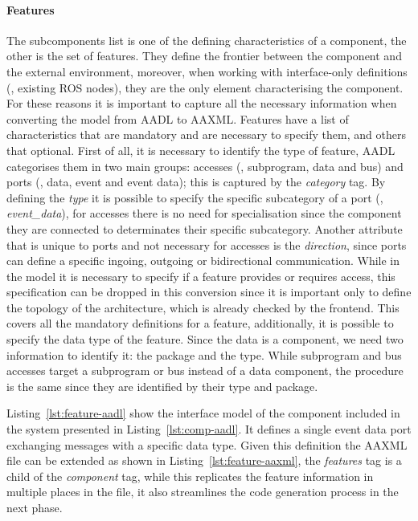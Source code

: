 \paragraph{Features} The subcomponents list is one of the defining characteristics of a component, the other is the set of features. They define the frontier between the component and the external environment, moreover, when working with interface-only definitions (\eg, existing ROS nodes), they are the only element characterising the component. For these reasons it is important to capture all the necessary information when converting the model from AADL to AAXML. Features have a list of characteristics that are mandatory and are necessary to specify them, and others that optional. First of all, it is necessary to identify the type of feature, AADL categorises them in two main groups: accesses (\ie, subprogram, data and bus) and ports (\ie, data, event and event data); this is captured by the \textit{category} tag. By defining the \textit{type} it is possible to specify the specific subcategory of a port (\eg, \textit{event\_data}), for accesses there is no need for specialisation since the component they are connected to determinates their  specific subcategory. Another attribute that is unique to ports and not necessary for accesses is the \textit{direction}, since ports can define a specific ingoing, outgoing or bidirectional communication. While in the model it is necessary to specify if a feature provides or requires access, this specification can be dropped in this conversion since it is important only to define the topology of the architecture, which is already checked by the frontend. This covers all the mandatory definitions for a feature, additionally, it is possible to specify the data type of the feature. Since the data is a component, we need two information to identify it: the package and the type. While subprogram and bus accesses target a subprogram or bus instead of a data component, the procedure is the same since they are identified by their type and package.

Listing~\ref{lst:feature-aadl} show the interface model of the component included in the system presented in Listing~\ref{lst:comp-aadl}. It defines a single event data port exchanging messages with a specific data type. Given this definition the AAXML file can be extended as shown in Listing~\ref{lst:feature-aaxml}, the \textit{features} tag is a child of the \textit{component} tag, while this replicates the feature information in multiple places in the file, it also streamlines the code generation process in the next phase.

